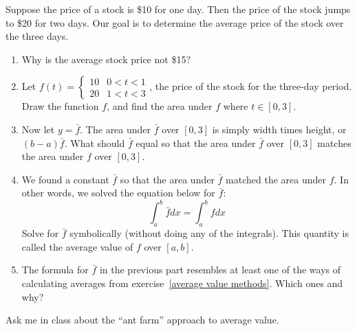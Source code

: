 \begin{problem}
 Suppose the price of a stock is \$10 for one day.  Then the price of the stock jumps to \$20 for two days.  Our goal is to determine the average price of the stock over the three days.
\begin{enumerate}
 \item Why is the average stock price not \$15?
 \item Let $f(t) = \begin{cases}10 &0<t<1\\20&1<t<3\end{cases}$, the price of the stock for the three-day period. Draw the function $f$, and find the area under $f$ where $t\in[0,3]$.
 \item Now let $y=\bar f$.  The area under $\bar f$ over $[0,3]$ is simply width times height, or $(b-a)\bar f$. What should $\bar f$ equal so that the area under $\bar f$ over $[0,3]$ matches the area under $f$ over $[0,3]$.
 \item We found a constant $\bar f$ so that the area under $\bar f$ matched the area under $f$. In other words, we solved the equation below for $\bar f$: 
$$\int_a^b \bar f dx = \int_a^b f dx$$
  Solve for $\bar f$ symbolically (without doing any of the integrals). This quantity is called the average value of $f$ over $[a,b]$.%
\item {}%
 The formula for $\bar f$ in the previous part resembles at least one of the ways of calculating averages from exercise~\ref{average value methods}.  Which ones and why?
\end{enumerate}
\end{problem}

%
Ask me in class about the ``ant farm'' approach to average value. 

